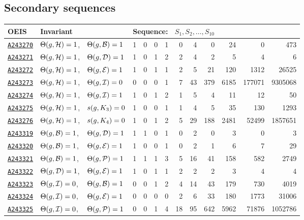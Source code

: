 \documentclass[12pt]{article}
\newcommand{\OEIS}[1]
{\href{https://oeis.org/#1}{\texttt{#1}}}
\begin{document}
\begin{appendices}
\subsection{Secondary sequences}

\begin{longtable}{ l l l r r r r r r r r r r}
\toprule
OEIS & Invariant & & 
\multicolumn{10}{l}{Sequence: \ $S_1, S_2, \ldots, S_{10}$ }
\\
\midrule\bottomrule
\OEIS{A243270} & $\Theta(g,\mathcal{H}) =1$, & $\Theta(g,\mathcal{B}) =1$ & 1 & 0 & 0 & 1 & 0 & 4 & 0 & 24 & 0 & 473 \\
\OEIS{A243271} & $\Theta(g,\mathcal{H}) =1$, & $\Theta(g,\mathcal{D}) =1$ & 1 & 0 & 1 & 2 & 2 & 4 & 2 & 5 & 4 & 6 \\
\OEIS{A243272} & $\Theta(g,\mathcal{H}) =1$, & $\Theta(g,\mathcal{E}) =1$ & 1 & 0 & 1 & 1 & 2 & 5 & 21 & 120 & 1312 & 26525 \\
\OEIS{A243273} & $\Theta(g,\mathcal{H}) =1$, & $\Theta(g,\mathcal{I}) =0$ & 0 & 0 & 0 & 1 & 7 & 43 & 379 & 6185 & 177071 & 9305068 \\
\OEIS{A243274} & $\Theta(g,\mathcal{H}) =1$, & $\Theta(g,\mathcal{I}) =1$ & 1 & 0 & 1 & 2 & 1 & 5 & 4 & 11 & 12 & 50 \\
\OEIS{A243275} & $\Theta(g,\mathcal{H}) =1$, & $s{}(g,K_3) =0$ & 1 & 0 & 0 & 1 & 1 & 4 & 5 & 35 & 130 & 1293 \\
\OEIS{A243276} & $\Theta(g,\mathcal{H}) =1$, & $s{}(g,K_4) =0$ & 1 & 0 & 1 & 2 & 5 & 29 & 188 & 2481 & 52499 & 1857651 \\
\OEIS{A243319} & $\Theta(g,\mathcal{B}) =1$, & $\Theta(g,\mathcal{D}) =1$ & 1 & 1 & 0 & 1 & 0 & 2 & 0 & 3 & 0 & 3 \\
\OEIS{A243320} & $\Theta(g,\mathcal{B}) =1$, & $\Theta(g,\mathcal{E}) =1$ & 1 & 0 & 0 & 1 & 0 & 2 & 1 & 6 & 7 & 29 \\
\OEIS{A243321} & $\Theta(g,\mathcal{B}) =1$, & $\Theta(g,\mathcal{P}) =1$ & 1 & 1 & 1 & 3 & 5 & 16 & 41 & 158 & 582 & 2749 \\
\OEIS{A243322} & $\Theta(g,\mathcal{D}) =1$, & $\Theta(g,\mathcal{E}) =1$ & 1 & 0 & 1 & 1 & 2 & 2 & 2 & 3 & 4 & 4 \\
\OEIS{A243323} & $\Theta(g,\mathcal{I}) =0$, & $\Theta(g,\mathcal{B}) =1$ & 0 & 0 & 1 & 2 & 4 & 14 & 43 & 179 & 730 & 4019 \\
\OEIS{A243324} & $\Theta(g,\mathcal{I}) =0$, & $\Theta(g,\mathcal{E}) =1$ & 0 & 0 & 0 & 0 & 2 & 6 & 33 & 180 & 1773 & 31006 \\
\OEIS{A243325} & $\Theta(g,\mathcal{I}) =0$, & $\Theta(g,\mathcal{P}) =1$ & 0 & 0 & 1 & 4 & 18 & 95 & 642 & 5962 & 71876 & 1052786 \\

\end{longtable}
\end{appendices}
\end{document}
